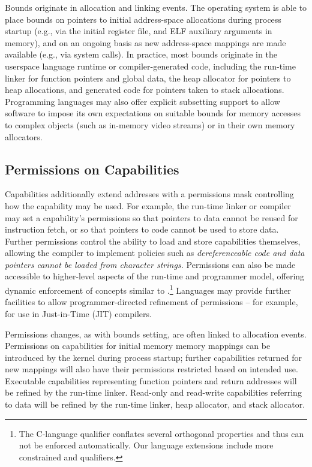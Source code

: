 Bounds originate in allocation and linking events.
The operating system is able to place bounds on pointers to initial
address-space
allocations during process startup (e.g., via the initial register file, and
ELF auxiliary arguments in memory), and on an ongoing basis as new address-space
mappings are made available (e.g., via  system calls).
In practice, most bounds originate in the userspace language runtime or
compiler-generated
code, including the run-time linker for function pointers and global data,
the heap allocator for pointers to heap allocations, and generated code for
pointers taken to stack allocations.
 Programming languages may also offer explicit subsetting support to allow
software to impose its own expectations on suitable bounds for memory accesses
to complex objects (such as in-memory video streams) or in their own memory
allocators.

\subsection{Permissions on Capabilities}
\label{sec:model-permissions}
Capabilities additionally extend addresses with a permissions mask controlling how the
capability may be used.
For example, the run-time linker or compiler may set a capability's
permissions so that pointers to data cannot be reused for instruction fetch,
or so that pointers to code cannot be used to store data.
Further permissions control the ability to load and store capabilities
themselves, allowing the compiler to implement policies such as 
\textit{dereferenceable code and data pointers cannot be loaded from character
strings.}
Permissions can also be made accessible to higher-level aspects of the
run-time and programmer model, offering dynamic enforcement of concepts
similar to .\footnote{The C-language  qualifier
conflates several orthogonal properties and thus can not be enforced
automatically.
Our language extensions include more constrained  and
 qualifiers.}
Languages may provide further facilities to allow programmer-directed
refinement of permissions -- for example, for use in Just-in-Time (JIT)
compilers.

Permissions changes, as with bounds setting, are often linked to allocation
events.
Permissions on capabilities for initial memory memory mappings can be
introduced by the kernel during process startup; further capabilities returned
for new mappings will also have their permissions restricted based on intended
use.
Executable capabilities representing function pointers and return addresses
will be refined by the run-time linker.
Read-only and read-write capabilities referring to data will be refined by the
run-time linker, heap allocator, and stack allocator.

